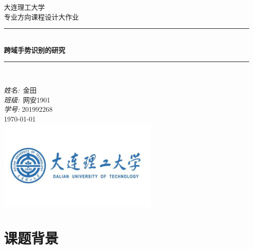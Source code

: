 \documentclass[a4paper]{article}
\begin{document}

\begin{titlepage}

\newcommand{\HRule}{\rule{\linewidth}{0.5mm}} 							%
\center 
 
\textsc{\LARGE 大连理工大学}\\[1cm]

\textsc{\Large 专业方向课程设计大作业}\\[0.2cm]

\HRule \\[0.8cm]
{ \huge \bfseries 跨域手势识别的研究}\\[0.7cm]								
\HRule \\[2cm]

\large

\emph{姓名:}\ 金\quad \quad 田  \\
\emph{班级:}\ 网安1901\\
\emph{学号:} 201992268\\[1.5cm]													%
{\large \today}\\[5cm]

\includegraphics[width=0.6\textwidth]{images/dlut.png}\\[1cm] 	%
\vfill 
\end{titlepage}


\setmainfont{Times New Roman}

\tableofcontents

\clearpage

\section{课题背景}
\end{document}
